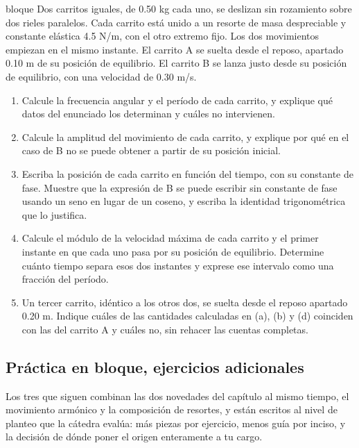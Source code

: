 \documentclass[11pt,openany]{book}
\begin{document}
\begin{ejercicio}{bloque}
Dos carritos iguales, de 0.50 kg cada uno, se deslizan sin rozamiento sobre dos rieles paralelos. Cada carrito está unido a un resorte de masa despreciable y constante elástica 4.5 N/m, con el otro extremo fijo. Los dos movimientos empiezan en el mismo instante. El carrito A se suelta desde el reposo, apartado 0.10 m de su posición de equilibrio. El carrito B se lanza justo desde su posición de equilibrio, con una velocidad de 0.30 m/s.
\begin{enumerate}[label=(\alph*), leftmargin=1.7em, itemsep=1pt, topsep=3pt]
  \item Calcule la frecuencia angular y el período de cada carrito, y explique qué datos del enunciado los determinan y cuáles no intervienen.
  \item Calcule la amplitud del movimiento de cada carrito, y explique por qué en el caso de B no se puede obtener a partir de su posición inicial.
  \item Escriba la posición de cada carrito en función del tiempo, con su constante de fase. Muestre que la expresión de B se puede escribir sin constante de fase usando un seno en lugar de un coseno, y escriba la identidad trigonométrica que lo justifica.
  \item Calcule el módulo de la velocidad máxima de cada carrito y el primer instante en que cada uno pasa por su posición de equilibrio. Determine cuánto tiempo separa esos dos instantes y exprese ese intervalo como una fracción del período.
  \item Un tercer carrito, idéntico a los otros dos, se suelta desde el reposo apartado 0.20 m. Indique cuáles de las cantidades calculadas en (a), (b) y (d) coinciden con las del carrito A y cuáles no, sin rehacer las cuentas completas.
\end{enumerate}
\end{ejercicio}

\subsection{Práctica en bloque, ejercicios adicionales}

Los tres que siguen combinan las dos novedades del capítulo al mismo tiempo, el movimiento armónico y la composición de resortes, y están escritos al nivel de planteo que la cátedra evalúa: más piezas por ejercicio, menos guía por inciso, y la decisión de dónde poner el origen enteramente a tu cargo.
\end{document}
